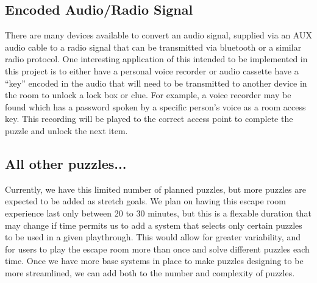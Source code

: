 \documentclass[conference]{IEEEtran}
\begin{document}
\subsection{Encoded Audio/Radio Signal}
There are many devices available to convert an audio signal, supplied via an AUX audio cable
to a radio signal that can be transmitted via bluetooth or a similar radio protocol. One interesting
application of this intended to be implemented in this project is to either have a personal voice recorder
or audio cassette have a ``key'' encoded in the audio that will need to be transmitted to another
device in the room to unlock a lock box or clue. For example, a voice recorder may be found which has
a password spoken by a specific person's voice as a room access key. This recording will be played
to the correct access point to complete the puzzle and unlock the next item.

\subsection{All other puzzles...}
Currently, we have this limited number of planned puzzles, but more puzzles are expected to be added
as stretch goals. We plan on having this escape room experience last only between 20 to 30 minutes,
but this is a flexable duration that may change if time permits us to add a system that selects
only certain puzzles to be used in a given playthrough. This would allow for greater variability,
and for users to play the escape room more than once and solve different puzzles each time.
Once we have more base systems in place to make puzzles designing to be more streamlined, we can add
both to the number and complexity of puzzles.
\end{document}
